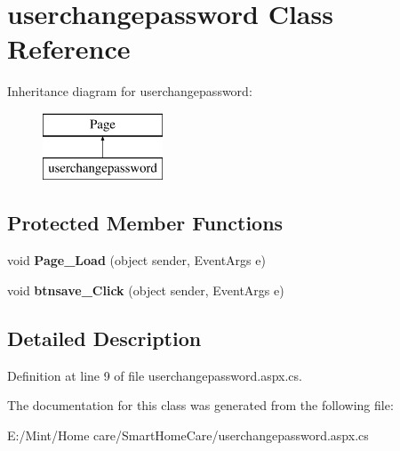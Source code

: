 \hypertarget{classuserchangepassword}{\section{userchangepassword Class Reference}
\label{classuserchangepassword}
}
Inheritance diagram for userchangepassword\-:\begin{figure}[H]
\begin{center}
\leavevmode
\includegraphics[height=2.000000cm]{classuserchangepassword}
\end{center}
\end{figure}
\subsection*{Protected Member Functions}
\begin{DoxyCompactItemize}
\item 
\hypertarget{classuserchangepassword_a0c49e55a8f1492823751f9a304707ba5}{void {\bfseries Page\-\_\-\-Load} (object sender, Event\-Args e)}\label{classuserchangepassword_a0c49e55a8f1492823751f9a304707ba5}

\item 
\hypertarget{classuserchangepassword_a27261e1143f2269d19db32f93e70d320}{void {\bfseries btnsave\-\_\-\-Click} (object sender, Event\-Args e)}\label{classuserchangepassword_a27261e1143f2269d19db32f93e70d320}

\end{DoxyCompactItemize}


\subsection{Detailed Description}


Definition at line 9 of file userchangepassword.\-aspx.\-cs.



The documentation for this class was generated from the following file\-:\begin{DoxyCompactItemize}
\item 
E\-:/\-Mint/\-Home care/\-Smart\-Home\-Care/userchangepassword.\-aspx.\-cs\end{DoxyCompactItemize}
